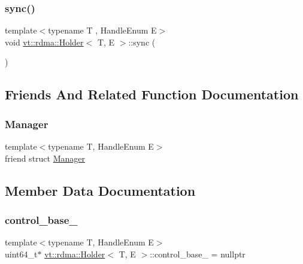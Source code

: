 \subsubsection{\texorpdfstring{sync()}{sync()}}
{\footnotesize\ttfamily template$<$typename T , Handle\+Enum E$>$ \\
void \hyperlink{structvt_1_1rdma_1_1_holder}{vt\+::rdma\+::\+Holder}$<$ T, E $>$\+::sync (\begin{DoxyParamCaption}{ }\end{DoxyParamCaption})}



\subsection{Friends And Related Function Documentation}
\mbox{\label{structvt_1_1rdma_1_1_holder_a1fd6b9bc3f72bb2b64e602de3982929d}} 
\subsubsection{\texorpdfstring{Manager}{Manager}}
{\footnotesize\ttfamily template$<$typename T, Handle\+Enum E$>$ \\
friend struct \hyperlink{structvt_1_1rdma_1_1_manager}{Manager}\hspace{0.3cm}{\ttfamily [friend]}}



\subsection{Member Data Documentation}
\mbox{\label{structvt_1_1rdma_1_1_holder_a4f9ee10b09fb58524ac3659f180a4a96}} 
\subsubsection{\texorpdfstring{control\+\_\+base\+\_\+}{control\_base\_}}
{\footnotesize\ttfamily template$<$typename T, Handle\+Enum E$>$ \\
uint64\+\_\+t$\ast$ \hyperlink{structvt_1_1rdma_1_1_holder}{vt\+::rdma\+::\+Holder}$<$ T, E $>$\+::control\+\_\+base\+\_\+ = nullptr\hspace{0.3cm}{\ttfamily [private]}}

